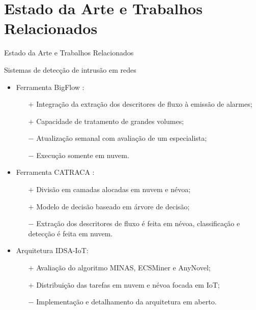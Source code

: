\documentclass[aspectratio=1610,10pt]{beamer}
\begin{document}
\section{Estado da Arte e Trabalhos Relacionados}

\newcommand{\arch}{IDSA-IoT\xspace}

\begin{frame}[fragile]{Estado da Arte e Trabalhos Relacionados}
\begin{alertblock}{Sistemas de detecção de intrusão em redes}
  \begin{itemize}
    \item Ferramenta BigFlow \cite{Viegas2019}:
    \begin{itemize}
      \item[$\boldsymbol{+}$] Integração da extração dos descritores de fluxo à emissão de alarmes;
      \item[$\boldsymbol{+}$] Capacidade de tratamento de grandes volumes;
      \item[$\boldsymbol{-}$] Atualização semanal com avaliação de um especialista;
      \item[$\boldsymbol{-}$] Execução somente em nuvem.
    \end{itemize}
    \item Ferramenta CATRACA \cite{Lopez2018,Sanz2018}:
    \begin{itemize}
      \item[$\boldsymbol{+}$] Divisão em camadas alocadas em nuvem e névoa;
      \item[$\boldsymbol{+}$] Modelo de decisão baseado em árvore de decisão;
      \item[$\boldsymbol{-}$] Extração dos descritores de fluxo é feita em
      névoa, classificação e detecção é feita em nuvem.
    \end{itemize}
    \item Arquitetura \arch \cite{Cassales2019a}:
    \begin{itemize}
      \item[$+$] Avaliação do algoritmo MINAS, ECSMiner e AnyNovel;
      \item[$+$] Distribuição das tarefas em nuvem e névoa focada em IoT;
      \item[$-$] Implementação e detalhamento da arquitetura em aberto.
    \end{itemize}
  \end{itemize}
\end{alertblock}
\end{frame}
\end{document}
